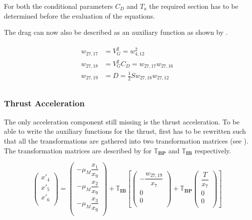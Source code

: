 \noindent
For both the conditional parameters $C_{D}$ and $T_{a}$  the required section has to be determined before the evaluation of the equations.

\noindent
The drag can now also be described as an auxiliary function as shown by .

\begin{align} \label{eq:dragAuxF}
\begin{split}
w_{27,17} &= V_{G}^{2} =  w_{4,12}^{2} \\
w_{27,18} &= V_{G}^{2}C_{D} = w_{27,17}w_{27,16} \\
w_{27,19} &= D = \frac{1}{2} S w_{27,18}w_{27,12} \\
\end{split}
\end{align}



\subsubsection{Thrust Acceleration}
\label{subsubsec:tsiThrust}
The only acceleration component still missing is the thrust acceleration. To be able to write the auxiliary functions for the thrust,  first has to be rewritten such that all the transformations are gathered into two transformation matrices (see ). The transformation matrices are described by  for $\mathbb{T}_{\mathbf{BP}}$ and $\mathbb{T}_{\mathbf{IB}}$ respectively.

\begin{equation} \label{eq:accAux}
\begin{pmatrix}
x'_{4}\\
x'_{5}\\
x'_{6}\\
\end{pmatrix}
=
\begin{pmatrix}
-\mu_{M}\dfrac{x_{1}}{x_{9}}\\
-\mu_{M}\dfrac{x_{2}}{x_{9}}\\
-\mu_{M}\dfrac{x_{3}}{x_{9}}\\
\end{pmatrix}+
\mathbb{T}_{\mathbf{IB}}\left[
\begin{pmatrix}
-\dfrac{w_{27,19}}{x_{7}}\\
0\\
0\\
\end{pmatrix}
+ 
\mathbb{T}_{\mathbf{BP}}
\begin{pmatrix}
\dfrac{T}{x_{7}}\\
0\\
0\\
\end{pmatrix}
\right]
\end{equation}


